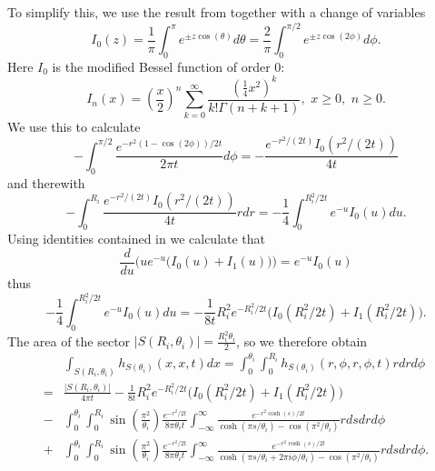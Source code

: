 \documentclass{amsart}
\theoremstyle{definition}
\begin{document}
To simplify this, we use the result from \cite[10.32.1]{dlmf} together with a change of variables 
\[ I_0 (z) = \frac 1 \pi \int_0 ^\pi e^{\pm z \cos(\theta)} d\theta = \frac 2 \pi \int_0 ^{\pi/2} e^{\pm z \cos(2\phi)} d\phi. \]
    Here $I_0$ is the modified Bessel function of order 0:
    \begin{equation*}
        I_n(x) = \left(\frac{x}{2}\right)^n\sum_{k = 0}^\infty \frac{(\frac{1}{4}x^2)^k}{k!\Gamma(n+k+1)}, \,\, x \geq 0, \,\, n \geq 0.
    \end{equation*}
We use this to calculate 
\[ - \int_0 ^{\pi/2}  \frac{e^{-r^2(1-\cos(2\phi))/2t}}{2\pi t}  d\phi = - \frac{e^{-r^2/(2t)} I_0 (r^2/(2t))}{4t}\]
and therewith 
\[ - \int_0 ^{R_i} \frac{e^{-r^2/(2t)} I_0 (r^2/(2t))}{4t} r dr = - \frac 1 4 \int_0^{R_i^2/2t} e^{-u}I_0(u) du. \] 
Using identities contained in \cite{watson1922treatise} we calculate that 
\begin{equation*}
    \frac{d}{du} \bigg(ue^{-u}\big(I_0(u) + I_1(u)\big)\bigg) = e^{-u}I_0(u)
\end{equation*}
thus 
\begin{equation*}
- \frac 1 4 \int_0^{R_i^2/2t} e^{-u}I_0(u) du = 
    - \frac{1}{8t} R_i^2e^{-R_i^2/2t} \big(I_0(R_i^2/2t) + I_1(R_i^2/2t)\big).
\end{equation*}
The area of the sector $|S(R_i, \theta_i)| = \frac{R_i^2 \theta_i}{2}$, so we therefore obtain 
\begin{align*}
    &\int_{S(R_i, \theta_i)} h_{S(\theta_i)}(x,x,t) dx = \int_0^{\theta_i}\int_0^{R_i} h_{S(\theta_i)}(r, \phi, r, \phi, t) rdrd\phi \\
     = & \frac{|S(R_i, \theta_i)|}{4\pi t}  - \frac{1}{8t} R_i^2e^{-R_i^2/2t} \big(I_0(R_i^2/2t) + I_1(R_i^2/2t)\big) \\ 
        - &\int_0^{\theta_i}\int_0^{R_i} \sin\left(\frac{\pi^2}{\theta_i}\right) \frac{e^{-r^2/2t}}{8\pi\theta_i t} \int_{-\infty}^\infty \frac{e^{-r^2\cosh(s)/2t}}{\cosh(\pi s/\theta_i) - \cos(\pi^2/\theta_i)} rds drd\phi \\
        + &\int_0^{\theta_i}\int_0^{R_i} \sin\left(\frac{\pi^2}{\theta_i}\right) \frac{e^{-r^2/2t}}{8\pi\theta_i t} \int_{-\infty}^\infty \frac{e^{-r^2\cosh(s)/2t}}{\cosh(\pi s/\theta_i + 2\pi i\phi/\theta_i) - \cos(\pi^2/\theta_i)} rds drd\phi.
\end{align*}
\end{document}

